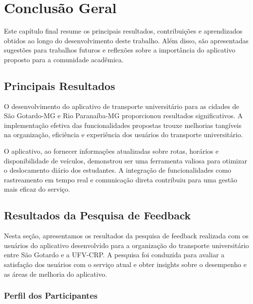 \documentclass[
    12pt,                   %
    openright,              %
    oneside,                %
    a4paper,                %
    sumario=tradicional,    %
    english,                %
    brazil,                 %
    ]{abntex2}
\begin{document}
    
    
\chapter{Conclusão Geral}

\label{chap:conclusao}

Este capítulo final resume os principais resultados, contribuições e aprendizados obtidos ao longo do desenvolvimento deste trabalho. Além disso, são apresentadas sugestões para trabalhos futuros e reflexões sobre a importância do aplicativo proposto para a comunidade acadêmica.

\section{Principais Resultados}

O desenvolvimento do aplicativo de transporte universitário para as cidades de São Gotardo-MG e Rio Paranaíba-MG proporcionou resultados significativos. A implementação efetiva das funcionalidades propostas trouxe melhorias tangíveis na organização, eficiência e experiência dos usuários do transporte universitário.

O aplicativo, ao fornecer informações atualizadas sobre rotas, horários e disponibilidade de veículos, demonstrou ser uma ferramenta valiosa para otimizar o deslocamento diário dos estudantes. A integração de funcionalidades como rastreamento em tempo real e comunicação direta contribuiu para uma gestão mais eficaz do serviço.

\section{Resultados da Pesquisa de Feedback}
\label{sec:resultados-feedback}

Nesta seção, apresentamos os resultados da pesquisa de feedback realizada com os usuários do aplicativo desenvolvido para a organização do transporte universitário entre São Gotardo e a UFV-CRP. A pesquisa foi conduzida para avaliar a satisfação dos usuários com o serviço atual e obter insights sobre o desempenho e as áreas de melhoria do aplicativo.

\subsection{Perfil dos Participantes}
\end{document}
